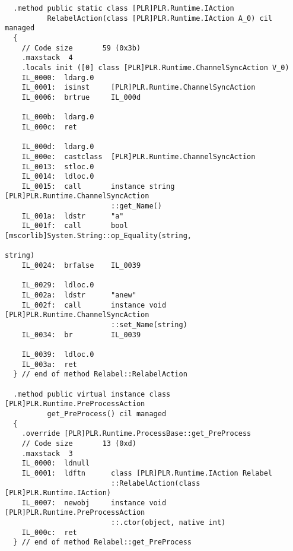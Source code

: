 \begin{lstlisting}
  .method public static class [PLR]PLR.Runtime.IAction 
          RelabelAction(class [PLR]PLR.Runtime.IAction A_0) cil managed
  {
    // Code size       59 (0x3b)
    .maxstack  4
    .locals init ([0] class [PLR]PLR.Runtime.ChannelSyncAction V_0)
    IL_0000:  ldarg.0
    IL_0001:  isinst     [PLR]PLR.Runtime.ChannelSyncAction
    IL_0006:  brtrue     IL_000d

    IL_000b:  ldarg.0
    IL_000c:  ret

    IL_000d:  ldarg.0
    IL_000e:  castclass  [PLR]PLR.Runtime.ChannelSyncAction
    IL_0013:  stloc.0
    IL_0014:  ldloc.0
    IL_0015:  call       instance string [PLR]PLR.Runtime.ChannelSyncAction
                         ::get_Name()
    IL_001a:  ldstr      "a"
    IL_001f:  call       bool [mscorlib]System.String::op_Equality(string,
                                                                   string)
    IL_0024:  brfalse    IL_0039

    IL_0029:  ldloc.0
    IL_002a:  ldstr      "anew"
    IL_002f:  call       instance void [PLR]PLR.Runtime.ChannelSyncAction
                         ::set_Name(string)
    IL_0034:  br         IL_0039

    IL_0039:  ldloc.0
    IL_003a:  ret
  } // end of method Relabel::RelabelAction

  .method public virtual instance class [PLR]PLR.Runtime.PreProcessAction 
          get_PreProcess() cil managed
  {
    .override [PLR]PLR.Runtime.ProcessBase::get_PreProcess
    // Code size       13 (0xd)
    .maxstack  3
    IL_0000:  ldnull
    IL_0001:  ldftn      class [PLR]PLR.Runtime.IAction Relabel
                         ::RelabelAction(class [PLR]PLR.Runtime.IAction)
    IL_0007:  newobj     instance void [PLR]PLR.Runtime.PreProcessAction
                         ::.ctor(object, native int)
    IL_000c:  ret
  } // end of method Relabel::get_PreProcess


\end{lstlisting}
